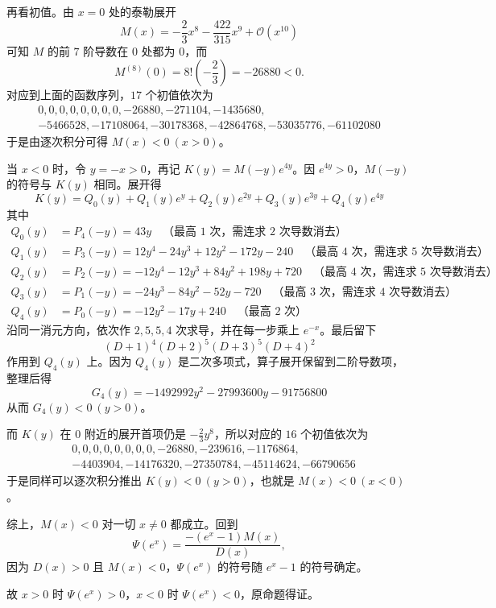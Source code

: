 \begin{solution}
再看初值。由 $x=0$ 处的泰勒展开
\[
M(x) = -\frac{2}{3}x^8 - \frac{422}{315}x^9 + \mathcal{O}(x^{10})
\]
可知 $M$ 的前 $7$ 阶导数在 $0$ 处都为 $0$，而
$$ M^{(8)}(0)=8!\left(-\frac23\right)=-26880<0. $$
对应到上面的函数序列，$17$ 个初值依次为
\begin{align*} 0, 0, 0, 0, 0, 0, 0, 0, -26880, -271104, -1435680, \\-5466528, -17108064, -30178368, -42864768, -53035776, -61102080  \end{align*}
于是由逐次积分可得 $M(x)<0\ (x>0)$。

当 $x<0$ 时，令 $y=-x>0$，再记 $K(y)=M(-y)e^{4y}$。因 $e^{4y}>0$，$M(-y)$ 的符号与 $K(y)$ 相同。展开得
$$ K(y) = Q_0(y) + Q_1(y)e^y + Q_2(y)e^{2y} + Q_3(y)e^{3y} + Q_4(y)e^{4y} $$
其中
\begin{align*}
 Q_0(y) &= P_4(-y) = 43y \quad \text{（最高 } 1 \text{ 次，需连求 } 2 \text{ 次导数消去）} \\
 Q_1(y) &= P_3(-y) = 12y^4 - 24y^3 + 12y^2 - 172y - 240 \quad \text{（最高 } 4 \text{ 次，需连求 } 5 \text{ 次导数消去）} \\
 Q_2(y) &= P_2(-y) = -12y^4 - 12y^3 + 84y^2 + 198y + 720 \quad \text{（最高 } 4 \text{ 次，需连求 } 5 \text{ 次导数消去）} \\
 Q_3(y) &= P_1(-y) = -24y^3 - 84y^2 - 52y - 720 \quad \text{（最高 } 3 \text{ 次，需连求 } 4 \text{ 次导数消去）} \\
 Q_4(y) &= P_0(-y) = -12y^2 - 17y + 240 \quad \text{（最高 } 2 \text{ 次）}
\end{align*}
沿同一消元方向，依次作 $2,5,5,4$ 次求导，并在每一步乘上 $e^{-x}$。最后留下
\[
(D+1)^4 (D+2)^5 (D+3)^5 (D+4)^2
\]
作用到 $Q_4(y)$ 上。因为 $Q_4(y)$ 是二次多项式，算子展开保留到二阶导数项，整理后得
$$ G_4(y) = -1492992y^2 - 27993600y - 91756800 $$
从而 $G_4(y)<0\ (y>0)$。

而 $K(y)$ 在 $0$ 附近的展开首项仍是 $-\frac23y^8$，所以对应的 $16$ 个初值依次为
\begin{align*} &0, 0, 0, 0, 0, 0, 0, 0, -26880, -239616, -1176864,\\
     &-4403904, -14176320, -27350784, -45114624, -66790656 \end{align*}
于是同样可以逐次积分推出 $K(y)<0\ (y>0)$，也就是 $M(x)<0\ (x<0)$。

综上，$M(x)<0$ 对一切 $x\ne0$ 都成立。回到
$$ \Psi(e^x)=\frac{-(e^x-1)M(x)}{D(x)}, $$
因为 $D(x)>0$ 且 $M(x)<0$，$\Psi(e^x)$ 的符号随 $e^x-1$ 的符号确定。

故 $x>0$ 时 $\Psi(e^x)>0$，$x<0$ 时 $\Psi(e^x)<0$，原命题得证。
\end{solution}

